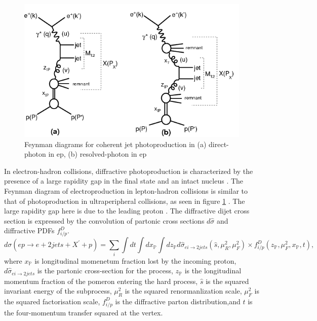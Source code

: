 \begin{figure}[]
\begin{centering}
\includegraphics[width=6in]{Chapter1/importfigs/h1_2015_feyn.png}
\par\end{centering}
\caption{Feynman diagrams for coherent jet photoproduction in (a) direct-photon in ep, (b) resolved-photon in ep \cite{Andreev:2015cwa} \label{fig:feynmanUPC1}}
\end{figure}

In electron-hadron collisions, diffractive photoproduction is characterized by the presence of a large rapidity gap in the final state and an intact nucleus \cite{Frankfurt:2006tp}\cite{Alexa:2013xxa}\cite{Aktas:2006qs}. The Feynman diagram of electroproduction in lepton-hadron collisions is similar to that of photoproduction in ultraperipheral collisions, as seen in figure \ref{fig:feynmanUPC1} \cite{Andreev:2015cwa}. The large rapidity gap here is due to the leading proton \cite{Aaron:2010aa}. The diffractive dijet cross section is expressed by the convolution of partonic cross sections $d\hat{\sigma}$ and diffractive PDFs $f^D_{i/p}$.
\begin{equation}
d\sigma (ep \rightarrow e + 2 jets + X^{'} + p) = \sum_{i} \int dt \int dx_\mathbb{P} \int dz_\mathbb{P}d\hat{\sigma}_{ei\rightarrow 2jets}(\hat{s},\mu^2_R,\mu^2_F)\times f^D_{i/p}(z_\mathbb{P},\mu^2_F,x_\mathbb{P},t) ,
\end{equation}
where $x_\mathbb{P}$ is longitudinal momenetum fraction lost by the incoming proton, $d\hat{\sigma}_{ei\rightarrow 2jets}$ is the partonic cross-section for the process, $z_\mathbb{P}$ is the longitudinal momentum fraction of the pomeron entering the hard process, $\hat{s}$ is the squared invariant energy of the subprocess, $\mu^2_R$ is the squared renormanlization scale, $\mu^2_F$ is the squared factorisation scale, $f^D_{i/p}$ is the diffractive parton distribution,and $t$ is the four-momentum transfer squared at the vertex. 

